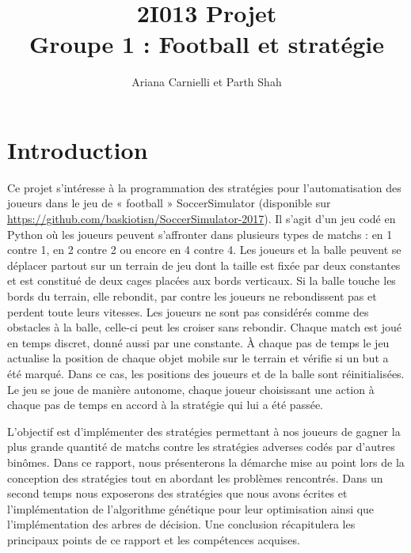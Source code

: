 \documentclass[a4paper,12pt]{article}
\begin{document}
\title{2I013 Projet \\ Groupe 1 : Football et stratégie}
\author{Ariana Carnielli et Parth Shah}
\date{}

\maketitle
\thispagestyle{empty}

\tableofcontents
\newpage

\pagestyle{plain}

\section{Introduction}

Ce projet s’intéresse à la programmation des stratégies pour l’automatisation des joueurs dans le jeu de  « football » SoccerSimulator (disponible sur \url{https://github.com/baskiotisn/SoccerSimulator-2017}). Il s'agit d'un jeu codé en Python où les joueurs peuvent s’affronter dans plusieurs types de matchs : en 1 contre 1, en 2 contre 2 ou encore en 4 contre 4. Les joueurs et la balle peuvent se déplacer partout sur un terrain de jeu dont la taille est fixée par deux constantes et est constitué de deux cages placées aux bords verticaux. Si la balle touche les bords du terrain, elle rebondit, par contre les joueurs ne rebondissent pas et perdent toute leurs vitesses. Les joueurs ne sont pas considérés comme des obstacles à la balle, celle-ci peut les croiser sans rebondir. Chaque match est joué en temps discret, donné aussi par une constante. À chaque pas de temps le jeu actualise la position de chaque objet mobile sur le terrain et vérifie si un but a été marqué. Dans ce cas, les positions des joueurs et de la balle sont réinitialisées. Le jeu se joue de manière autonome, chaque joueur choisissant une action à chaque pas de temps en accord à la stratégie qui lui a été passée.

L’objectif est d’implémenter des stratégies permettant à nos joueurs de gagner la plus grande quantité de matchs contre les stratégies adverses codés par d'autres binômes. Dans ce rapport, nous présenterons la démarche mise au point lors de la conception des stratégies tout en abordant les problèmes rencontrés. Dans un second temps nous exposerons des stratégies que nous avons écrites et l'implémentation de l’algorithme génétique pour leur optimisation ainsi que l’implémentation des arbres de décision. Une conclusion récapitulera les principaux points de ce rapport et les compétences acquises.
\end{document}
